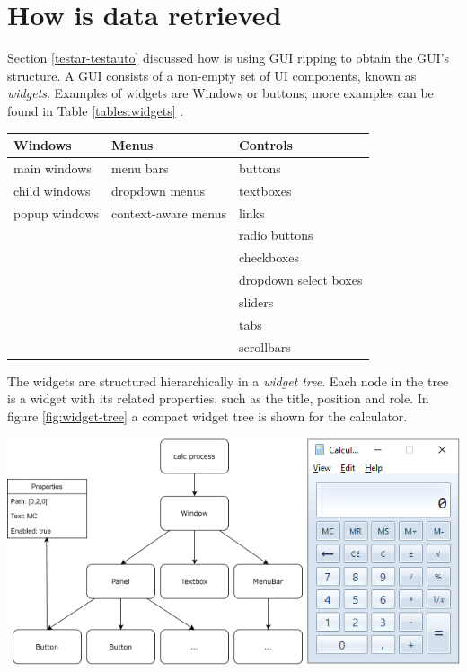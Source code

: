\section{How is data retrieved} \label{data-retrieval}

Section \ref{testar-testauto} discussed how \testar is using GUI ripping to obtain the GUI's structure. A GUI consists of a non-empty set of UI components, known as \emph{widgets}. Examples of widgets are Windows or buttons; more examples can be found in Table \ref{tables:widgets} \cite{VosAho2021}. 

\begingroup
\captionsetup{type=table}
\begin{tabularx}{\textwidth}{ 
  | >{\raggedright\arraybackslash}X 
  | >{\raggedright\arraybackslash}X 
  | >{\raggedright\arraybackslash}X | }
    \hline
    Windows & Menus & Controls \\
    \hline
    \hline
    main windows & menu bars & buttons \\
    child windows & dropdown menus & textboxes \\
    popup windows & context-aware menus & links \\
    && radio buttons \\
    && checkboxes\\
    && dropdown select boxes\\
    && sliders\\
    && tabs\\
    && scrollbars \\
    \hline
\end{tabularx}
\label{tables:widgets}
\endgroup

The widgets are structured hierarchically in a \emph{widget tree}. Each node in the tree is a widget with its related properties, such as the title, position and role. In figure \ref{fig:widget-tree} a compact widget tree is shown for the calculator. 

\bigskip
\begingroup
\captionsetup{type=figure}
\includegraphics[scale=0.7]{images/calc-tree.png}
\label{fig:widget-tree}
\endgroup


